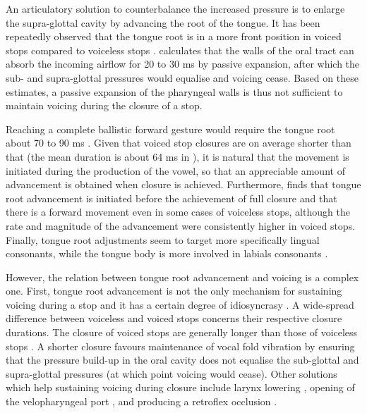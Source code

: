 \documentclass[12pt,]{article}
\begin{document}
An articulatory solution to counterbalance the increased pressure is to
enlarge the supra-glottal cavity by advancing the root of the tongue. It
has been repeatedly observed that the tongue root is in a more front
position in voiced stops compared to voiceless stops
\citep{kent1969, perkell1969, westbury1983}. \citet{rothenberg1967}
calculates that the walls of the oral tract can absorb the incoming
airflow for 20 to 30 ms by passive expansion, after which the sub- and
supra-glottal pressures would equalise and voicing cease. Based on these
estimates, a passive expansion of the pharyngeal walls is thus not
sufficient to maintain voicing during the closure of a stop.

Reaching a complete ballistic forward gesture would require the tongue
root about 70 to 90 ms \citep{rothenberg1967}. Given that voiced stop
closures are on average shorter than that (the mean duration is about 64
ms in \citet{luce1985}), it is natural that the movement is initiated
during the production of the vowel, so that an appreciable amount of
advancement is obtained when closure is achieved. Furthermore,
\citet{westbury1983} finds that tongue root advancement is initiated
before the achievement of full closure and that there is a forward
movement even in some cases of voiceless stops, although the rate and
magnitude of the advancement were consistently higher in voiced stops.
Finally, tongue root adjustments seem to target more specifically
lingual consonants, while the tongue body is more involved in labials
consonants \citet{perkell1969, westbury1983}.

However, the relation between tongue root advancement and voicing is a
complex one. First, tongue root advancement is not the only mechanism
for sustaining voicing during a stop
\citep{rothenberg1967, westbury1983, ohala2011} and it has a certain
degree of idiosyncrasy \citep{ahn2016}. A wide-spread difference between
voiceless and voiced stops concerns their respective closure durations.
The closure of voiced stops are generally longer than those of voiceless
stops
\citep{lisker1957, umeda1977, van-summers1987, davis1989, de-jong1991}.
A shorter closure favours maintenance of vocal fold vibration by
ensuring that the pressure build-up in the oral cavity does not equalise
the sub-glottal and supra-glottal pressures (at which point voicing
would cease). Other solutions which help sustaining voicing during
closure include larynx lowering \citep{riordan1980}, opening of the
velopharyngeal port \citep{yanagihara1966}, and producing a retroflex
occlusion \citep{sprouse2008}.
\end{document}
